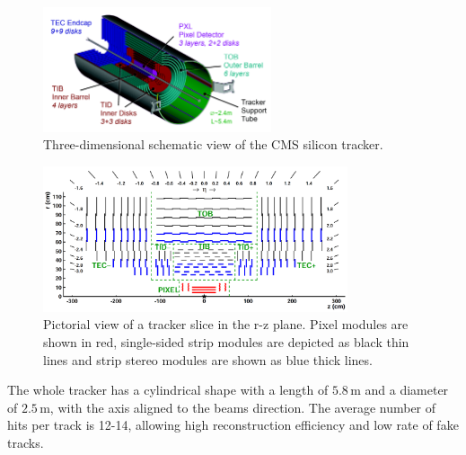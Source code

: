 \begin{figure}[htb]
\centering
\includegraphics[width=0.6\textwidth]{images/tracker.pdf}
\caption{Three-dimensional schematic view of the CMS silicon tracker.}\label{fig:tracker3D}
\end{figure}
\begin{figure}[htb]
\centering
\includegraphics[width=0.8\textwidth]{images/tracker2D.pdf}
\caption{Pictorial view of a tracker slice in the r-z plane. Pixel modules are
shown in red, single-sided strip modules are depicted as black thin lines and
strip stereo modules are shown as blue thick lines.}\label{fig:tracker2D}
\end{figure}

The whole tracker has a cylindrical shape with a length of $5.8$\,m and a diameter of $2.5$\,m, with the axis aligned to the beams direction. The average number of hits per track is 12-14, allowing high reconstruction efficiency and low rate of fake tracks.


